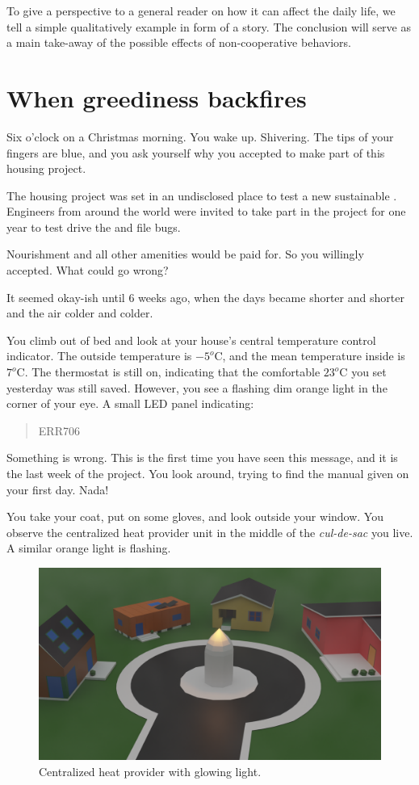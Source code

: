 \documentclass[../main.tex]{subfiles}
\begin{document}
To give a perspective to a general reader on how it can affect the daily life, we tell a simple qualitatively example in form of a story. The conclusion will serve as a main take-away of the possible effects of non-cooperative behaviors.
\newpage
\section{When greediness backfires}
Six o'clock on a Christmas morning.
You wake up.
Shivering.
The tips of your fingers are blue, and you ask yourself why you accepted to make part of this housing project.

The housing project was set in an undisclosed place to test a new sustainable \dhn{}.
Engineers from around the world were invited to take part in the project for one year to test drive the \dhn{} and file bugs.

Nourishment and all other amenities would be paid for.
So you willingly accepted.
What could go wrong?

It seemed okay-ish until $6$ weeks ago, when the days became shorter and shorter and the air colder and colder.

You climb out of bed and look at your house's central temperature control indicator. The outside temperature is $-5^{o}$C, and the mean temperature inside is $7^{o}$C.
The thermostat is still on, indicating that the comfortable $23^{o}$C you set yesterday was still saved. However, you see a flashing dim orange light in the corner of your eye. A small LED panel indicating:
\begin{quote}
ERR706
\end{quote}

Something is wrong.
This is the first time you have seen this message, and it is the last week of the project.
You look around, trying to find the manual given on your first day. Nada!

You take your coat, put on some gloves, and look outside your window.
You observe the centralized heat provider unit in the middle of the \emph{cul-de-sac} you live.
A similar orange light is flashing.
\begin{figure}[H]
  \centering
  \includegraphics[width=.75\textwidth]{../img/district_3d_cycles_lights2.png}
  \caption{Centralized heat provider with glowing light.}\label{fig:culdesac}
\end{figure}
\end{document}
